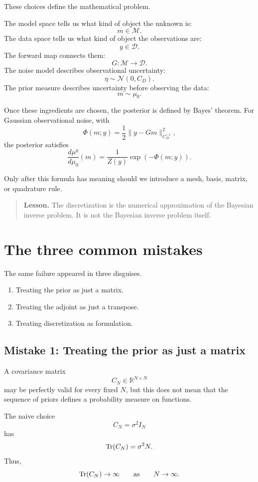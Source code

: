 \documentclass[11pt,a4paper]{book}
\newenvironment{lesson}
  {\begin{quote}\textbf{Lesson.}}
  {\end{quote}}
\newcommand{\M}{\mathcal{M}}      %
\newcommand{\D}{\mathcal{D}}      %
\newcommand{\R}{\mathbb{R}}
\newcommand{\prior}{\mu_0}
\newcommand{\post}{\mu^y}
\newcommand{\noise}{\eta}
\newcommand{\obs}{y}
\newcommand{\G}{G}
\begin{document}
These choices define the mathematical problem.

The model space tells us what kind of object the unknown is:
\[
    m\in\M.
\]
The data space tells us what kind of object the observations are:
\[
    \obs\in\D.
\]
The forward map connects them:
\[
    \G:\M\to\D.
\]
The noise model describes observational uncertainty:
\[
    \noise\sim\mathcal{N}(0,C_D).
\]
The prior measure describes uncertainty before observing the data:
\[
    m\sim\prior.
\]

Once these ingredients are chosen, the posterior is defined by Bayes' theorem.
For Gaussian observational noise, with
\[
    \Phi(m;\obs)
    =
    \frac{1}{2}
    \|\obs-\G m\|_{C_D^{-1}}^2,
\]
the posterior satisfies
\[
    \frac{d\post}{d\prior}(m)
    =
    \frac{1}{Z(\obs)}
    \exp(-\Phi(m;\obs)).
\]

Only after this formula has meaning should we introduce a mesh, basis, matrix,
or quadrature rule.

\begin{lesson}
The discretization is the numerical approximation of the Bayesian inverse
problem. It is not the Bayesian inverse problem itself.
\end{lesson}

\section{The three common mistakes}

The same failure appeared in three disguises.

\begin{enumerate}[label=\arabic*.]
    \item Treating the prior as just a matrix.
    \item Treating the adjoint as just a transpose.
    \item Treating discretization as formulation.
\end{enumerate}

\subsection*{Mistake 1: Treating the prior as just a matrix}

A covariance matrix
\[
    C_N\in\R^{N\times N}
\]
may be perfectly valid for every fixed $N$, but this does not mean that the
sequence of priors defines a probability measure on functions.

The naive choice
\[
    C_N=\sigma^2 I_N
\]
has
\[
    \Tr(C_N)=\sigma^2 N.
\]
Thus,
\[
    \Tr(C_N)\to\infty
    \qquad
    \text{as}
    \qquad
    N\to\infty.
\]
\end{document}
